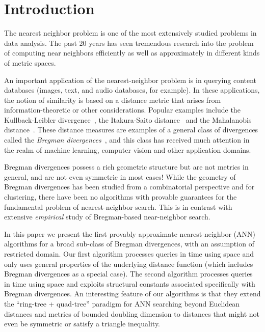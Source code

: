 \documentclass[11pt]{myclass}
\begin{document}
\section{Introduction}
\label{Introduction}
The nearest neighbor problem is one of the most extensively studied problems in data analysis. The past 20 years has seen tremendous research into the problem of computing near neighbors efficiently as well as approximately in different kinds of metric spaces.

An important application of the nearest-neighbor problem is in querying content databases (images, text, and audio databases, for example). In these applications, the notion of similarity is  based on a distance metric that arises from information-theoretic or other considerations. Popular examples include the Kullback-Leibler divergence~\cite{kullback}, the Itakura-Saito distance~\cite{itakura} and the Mahalanobis distance~\cite{mahalanobis36}. These distance measures are examples of a general class of divergences called the \emph{Bregman divergences}~\cite{bregman}, and this class has received much attention in the realm of machine learning, computer vision and other application domains. 


Bregman divergences possess a rich geometric structure but are not metrics in general, and are not even symmetric in most cases! While the  geometry of Bregman divergences has been studied from a combinatorial perspective and for clustering, there have been no algorithms with provable guarantees for the fundamental  problem of nearest-neighbor search. This is in contrast with extensive \emph{empirical} study of Bregman-based near-neighbor search\cite{caytonpaper,vptrees,tailoredbregmannn,spellmanvemuri,bregsearch}. 

In this paper we present the first provably approximate nearest-neighbor (ANN) algorithms for a broad sub-class of Bregman divergences, with an assumption of restricted domain. Our first algorithm processes queries in  time using  space and only uses general properties of the underlying distance function (which includes Bregman divergences as a special case). The second algorithm processes queries in  time using  space and exploits structural constants associated specifically with Bregman divergences. An interesting feature of our algorithms is that they extend the ``ring-tree + quad-tree'' paradigm for ANN searching beyond Euclidean distances and metrics of bounded doubling dimension to distances that might not even be symmetric or satisfy a triangle inequality. 
\end{document}
